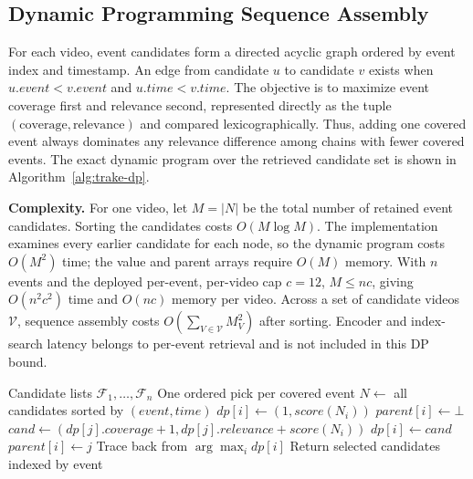 \documentclass[conference]{IEEEtran}
\begin{document}
\subsection{Dynamic Programming Sequence Assembly}

For each video, event candidates form a directed acyclic graph ordered by event
index and timestamp. An edge from candidate $u$ to candidate $v$ exists when
$u.event < v.event$ and $u.time < v.time$. The objective is to maximize event
coverage first and relevance second, represented directly as the tuple
$(\mathrm{coverage},\mathrm{relevance})$ and compared lexicographically. Thus,
adding one covered event always dominates any relevance difference among chains
with fewer covered events. The exact dynamic program over the retrieved
candidate set is shown in Algorithm~\ref{alg:trake-dp}.

\textbf{Complexity.} For one video, let $M=|N|$ be the total number of retained
event candidates. Sorting the candidates costs $O(M\log M)$. The implementation
examines every earlier candidate for each node, so the dynamic program costs
$O(M^2)$ time; the value and parent arrays require $O(M)$ memory. With $n$ events
and the deployed per-event, per-video cap $c=12$, $M\leq nc$, giving
$O(n^2c^2)$ time and $O(nc)$ memory per video. Across a set of candidate videos
$\mathcal{V}$, sequence assembly costs
$O(\sum_{V\in\mathcal{V}} M_V^2)$ after sorting. Encoder and index-search latency
belongs to per-event retrieval and is not included in this DP bound.

\begin{algorithm}[t]
\caption{TRAKE lexicographic increasing-chain DP}
\label{alg:trake-dp}
\begin{algorithmic}[1]
\Require Candidate lists $\mathcal{F}_1,\ldots,\mathcal{F}_n$
\Ensure One ordered pick per covered event
\State $N \gets$ all candidates sorted by $(event,time)$
  \State $dp[i] \gets (1, score(N_i))$
  \State $parent[i] \gets \bot$
      \State $cand \gets (dp[j].coverage + 1, dp[j].relevance + score(N_i))$
        \State $dp[i] \gets cand$
        \State $parent[i] \gets j$
      \EndIf
    \EndIf
  \EndFor
\EndFor
\State Trace back from $\arg\max_i dp[i]$
\State Return selected candidates indexed by event
\end{algorithmic}
\end{algorithm}
\end{document}
